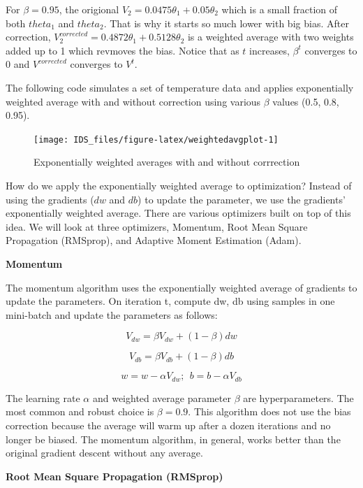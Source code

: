 \documentclass[12pt,]{krantz}
\begin{document}
For \(\beta = 0.95\), the origional \(V_2 = 0.0475\theta_{1}+0.05\theta_{2}\) which is a small fraction of both \(theta_1\) and \(theta_2\). That is why it starts so much lower with big bias. After correction, \(V_{2}^{corrected} = 0.4872\theta_{1}+0.5128\theta_{2}\) is a weighted average with two weights added up to 1 which revmoves the bias. Notice that as \(t\) increases, \(\beta^t\) converges to 0 and \(V^{corrected}\) converges to \(V^t\).

The following code simulates a set of temperature data and applies exponentially weighted average with and without correction using various \(\beta\) values (0.5, 0.8, 0.95).

\begin{figure}

{\centering \texttt{[image: IDS\_files/figure-latex/weightedavgplot-1]} 

}

\caption{Exponentially weighted averages with and without corrrection}\label{fig:weightedavgplot}
\end{figure}

How do we apply the exponentially weighted average to optimization? Instead of using the gradients (\(dw\) and \(db\)) to update the parameter, we use the gradients' exponentially weighted average. There are various optimizers built on top of this idea. We will look at three optimizers, Momentum, Root Mean Square Propagation (RMSprop), and Adaptive Moment Estimation (Adam).

\textbf{Momentum}

The momentum algorithm uses the exponentially weighted average of gradients to update the parameters. On iteration t, compute dw, db using samples in one mini-batch and update the parameters as follows:

\[V_{dw} = \beta V_{dw}+(1-\beta)dw\]

\[V_{db} = \beta V_{db}+(1-\beta)db\]

\[w=w-\alpha V_{dw};\ \ b=b-\alpha V_{db}\]

The learning rate \(\alpha\) and weighted average parameter \(\beta\) are hyperparameters. The most common and robust choice is \(\beta = 0.9\). This algorithm does not use the bias correction because the average will warm up after a dozen iterations and no longer be biased. The momentum algorithm, in general, works better than the original gradient descent without any average.

\textbf{Root Mean Square Propagation (RMSprop)}
\end{document}
